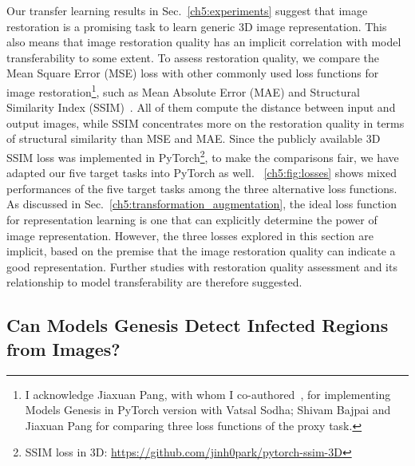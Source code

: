 Our transfer learning results in Sec.~\ref{ch5:experiments} suggest that image restoration is a promising task to learn generic 3D image representation. This also means that image restoration quality has an implicit correlation with model transferability to some extent. To assess restoration quality, we compare the Mean Square Error (MSE) loss with other commonly used loss functions for image restoration\footnote{I acknowledge Jiaxuan Pang, with whom I co-authored~\citet{zhou2019models,zhou2021models}, for implementing Models Genesis in PyTorch version with Vatsal Sodha; Shivam Bajpai and Jiaxuan Pang for comparing three loss functions of the proxy task.}, such as Mean Absolute Error (MAE) and Structural Similarity Index (SSIM)~\citep{wang2004image}. All of them compute the distance between input and output images, while SSIM concentrates more on the restoration quality in terms of structural similarity than MSE and MAE. Since the publicly available 3D SSIM loss was implemented in PyTorch\footnote{\label{foot:ssim}SSIM loss in 3D: \href{https://github.com/jinh0park/pytorch-ssim-3D}{https://github.com/jinh0park/pytorch-ssim-3D}}, to make the comparisons fair, we have adapted our five target tasks into PyTorch as well. 
\figurename~\ref{ch5:fig:losses} shows mixed performances of the five target tasks among the three alternative loss functions. As discussed in Sec.~\ref{ch5:transformation_augmentation}, the ideal loss function for representation learning is one that can explicitly determine the power of image representation. However, the three losses explored in this section are implicit, based on the premise that the image restoration quality can indicate a good representation. 
Further studies with restoration quality assessment and its relationship to model transferability are therefore suggested.



\subsection{Can Models Genesis Detect Infected Regions from Images?}
\label{ch5:disease_detection}


